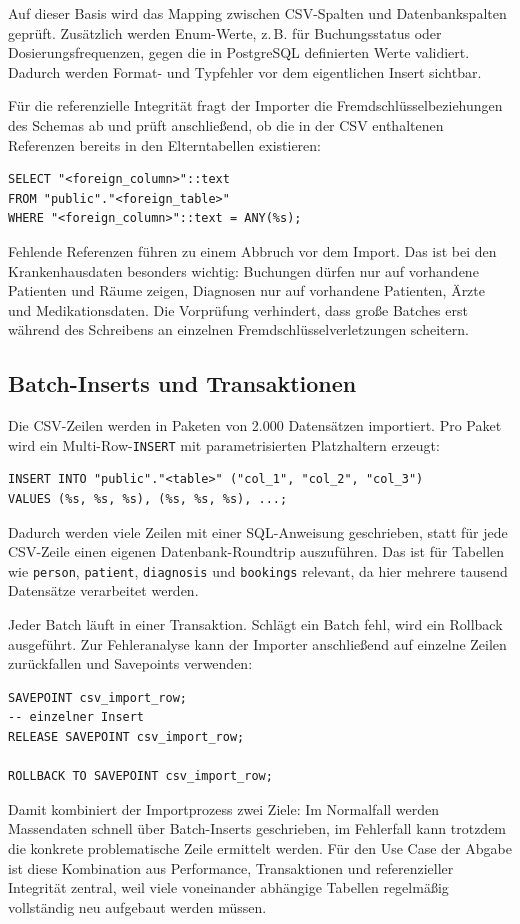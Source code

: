 Auf dieser Basis wird das Mapping zwischen CSV-Spalten und Datenbankspalten geprüft. Zusätzlich
werden Enum-Werte, z.\,B. für Buchungsstatus oder Dosierungsfrequenzen, gegen die in PostgreSQL
definierten Werte validiert. Dadurch werden Format- und Typfehler vor dem eigentlichen Insert
sichtbar.

Für die referenzielle Integrität fragt der Importer die Fremdschlüsselbeziehungen des Schemas ab
und prüft anschließend, ob die in der CSV enthaltenen Referenzen bereits in den Elterntabellen
existieren:

\begin{lstlisting}[style=sqlstyle]
SELECT "<foreign_column>"::text
FROM "public"."<foreign_table>"
WHERE "<foreign_column>"::text = ANY(%s);
\end{lstlisting}

Fehlende Referenzen führen zu einem Abbruch vor dem Import. Das ist bei den Krankenhausdaten
besonders wichtig: Buchungen dürfen nur auf vorhandene Patienten und Räume zeigen, Diagnosen nur
auf vorhandene Patienten, Ärzte und Medikationsdaten. Die Vorprüfung verhindert, dass große Batches
erst während des Schreibens an einzelnen Fremdschlüsselverletzungen scheitern.

\subsection{Batch-Inserts und Transaktionen}

Die CSV-Zeilen werden in Paketen von 2.000 Datensätzen importiert. Pro Paket wird ein
Multi-Row-\texttt{INSERT} mit parametrisierten Platzhaltern erzeugt:

\begin{lstlisting}[style=sqlstyle]
INSERT INTO "public"."<table>" ("col_1", "col_2", "col_3")
VALUES (%s, %s, %s), (%s, %s, %s), ...;
\end{lstlisting}

Dadurch werden viele Zeilen mit einer SQL-Anweisung geschrieben, statt für jede CSV-Zeile einen
eigenen Datenbank-Roundtrip auszuführen. Das ist für Tabellen wie \texttt{person}, \texttt{patient},
\texttt{diagnosis} und \texttt{bookings} relevant, da hier mehrere tausend Datensätze verarbeitet
werden.

Jeder Batch läuft in einer Transaktion. Schlägt ein Batch fehl, wird ein Rollback ausgeführt. Zur
Fehleranalyse kann der Importer anschließend auf einzelne Zeilen zurückfallen und Savepoints
verwenden:

\begin{lstlisting}[style=sqlstyle]
SAVEPOINT csv_import_row;
-- einzelner Insert
RELEASE SAVEPOINT csv_import_row;

ROLLBACK TO SAVEPOINT csv_import_row;
\end{lstlisting}

Damit kombiniert der Importprozess zwei Ziele: Im Normalfall werden Massendaten schnell über
Batch-Inserts geschrieben, im Fehlerfall kann trotzdem die konkrete problematische Zeile ermittelt
werden. Für den Use Case der Abgabe ist diese Kombination aus Performance, Transaktionen und
referenzieller Integrität zentral, weil viele voneinander abhängige Tabellen regelmäßig vollständig
neu aufgebaut werden müssen.
